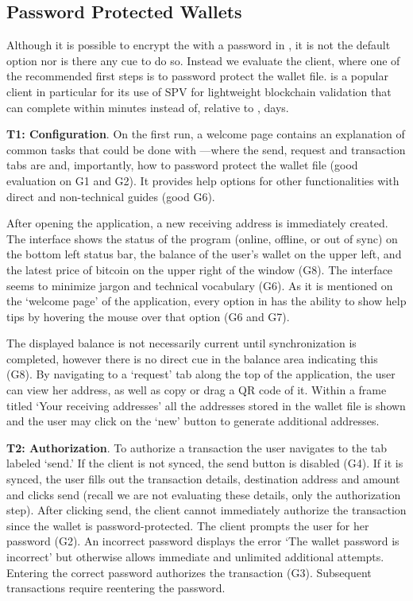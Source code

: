 
\subsection{Password Protected Wallets}
Although it is possible to encrypt the \walletfile with a password in \bitcoinclient, it is not the default option nor is there any cue to do so. Instead we evaluate the \multibit client, where one of the recommended first steps is to password protect the wallet file. \multibit is a popular client in particular for its use of SPV for lightweight blockchain validation that can complete within minutes instead of, relative to \bitcoinclient, days.

\textbf{T1: Configuration}.
On the first run, a welcome page contains an explanation of common tasks that could be done with \multibit---where the send, request and transaction tabs are and, importantly, how to password protect the wallet file (good evaluation on G1 and G2). It provides help options for other functionalities with direct and non-technical guides (good G6). 

After opening the application, a new receiving address is immediately created. The interface shows the status of the program (online, offline, or out of sync) on the bottom left status bar, the balance of the user's wallet on the upper left, and the latest price of bitcoin on the upper right of the window (G8). The interface seems to minimize jargon and technical vocabulary (G6). As it is mentioned on the `welcome page' of the application, every option in \multibit has the ability to show help tips by hovering the mouse over that option (G6 and G7).

The displayed balance is not necessarily current until synchronization is completed, however there is no direct cue in the balance area indicating this (G8). By navigating to a `request' tab along the top of the application, the user can view her address, as well as copy or drag a QR code of it. Within a frame titled `Your receiving addresses' all the addresses stored in the wallet file is shown and the user may click on the `new' button to generate additional addresses. 

\textbf{T2: Authorization}.
To authorize a transaction the user navigates to the tab labeled `send.' If the client is not synced, the send button is disabled (G4). If it is synced, the user fills out the transaction details, destination address and amount and clicks send (recall we are not evaluating these details, only the authorization step). After clicking send, the client cannot immediately authorize the transaction since the wallet is password-protected. The client prompts the user for her password (G2). An incorrect password displays the error `The wallet password is incorrect' but otherwise allows immediate and unlimited additional attempts. Entering the correct password authorizes the transaction (G3). Subsequent transactions require reentering the password.

